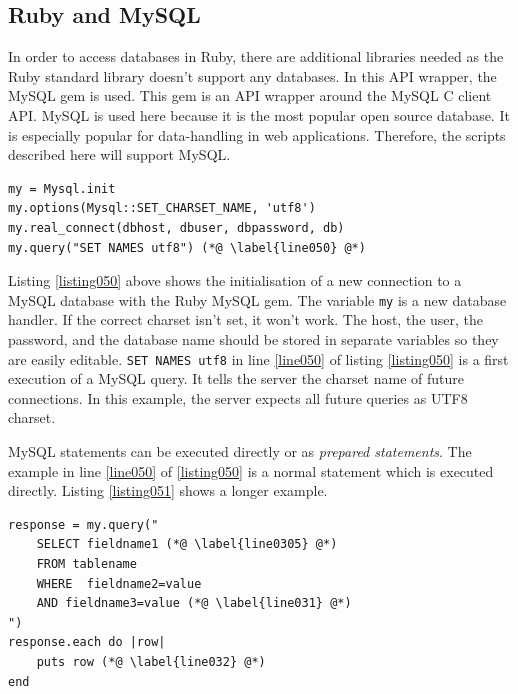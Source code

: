 \subsection{Ruby and MySQL}\label{rubymysql}
In order to access databases in Ruby, there are additional libraries needed as the Ruby standard library doesn't support any databases. In this API wrapper, the MySQL gem is used. This gem is an API wrapper around the MySQL C client API. MySQL is used here because it is the most popular open source database. \cite{mysql:popularity} It is especially popular for data-handling in web applications. Therefore, the scripts described here will support MySQL.

\begin{lstlisting}[aboveskip=1\baselineskip, caption=Initialising a database connection\index{database!connection}., label=listing050]
my = Mysql.init
my.options(Mysql::SET_CHARSET_NAME, 'utf8')
my.real_connect(dbhost, dbuser, dbpassword, db)
my.query("SET NAMES utf8") (*@ \label{line050} @*)	
\end{lstlisting}

Listing \ref{listing050} above shows the initialisation of a new connection to a MySQL database with the Ruby MySQL gem. The variable \lstinline{my} is a new database handler. If the correct charset isn't set, it won't work. The host, the user, the password, and the database name should be stored in separate variables so they are easily editable. \lstinline{SET NAMES utf8} in line \ref{line050} of listing \ref{listing050} is a first execution of a MySQL query. It tells the server the charset name of future connections. In this example, the server expects all future queries as UTF8  charset.

MySQL statements can be executed directly or as \emph{prepared statements}. The example in line \ref{line050} of  \ref{listing050} is a normal statement which is executed directly. Listing \ref{listing051} shows a longer example. 

\begin{lstlisting}[aboveskip=1\baselineskip, caption=Example for a directly executed MySQL query., label=listing051]
response = my.query(" 
	SELECT fieldname1 (*@ \label{line0305} @*)
	FROM tablename 
	WHERE  fieldname2=value
	AND fieldname3=value (*@ \label{line031} @*)
")
response.each do |row|
	puts row (*@ \label{line032} @*)
end
\end{lstlisting}

